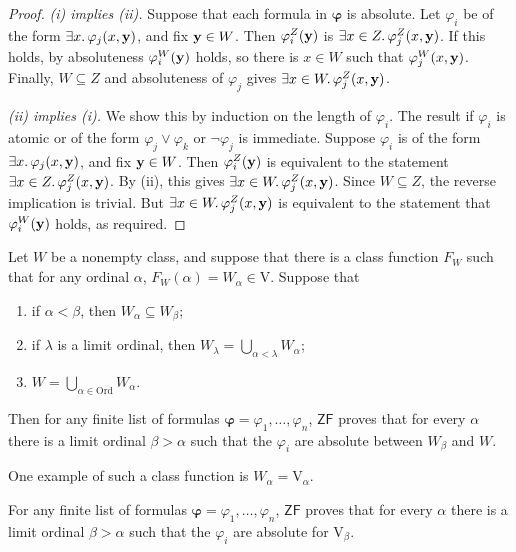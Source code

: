 \begin{proof}
    \emph{(i) implies (ii).}
    Suppose that each formula in \( \bm\varphi \) is absolute.
    Let \( \varphi_i \) be of the form \( \exists x.\, \varphi_j(x, \vb y) \), and fix \( \vb y \in W \).
    Then \( \varphi_i^Z(\vb y) \) is \( \exists x \in Z.\, \varphi_j^Z(x, \vb y) \).
    If this holds, by absoluteness \( \varphi_i^W(\vb y) \) holds, so there is \( x \in W \) such that \( \varphi_j^W(x, \vb y) \).
    Finally, \( W \subseteq Z \) and absoluteness of \( \varphi_j \) gives \( \exists x \in W.\, \varphi_j^Z(x, \vb y) \).

    \emph{(ii) implies (i).}
    We show this by induction on the length of \( \varphi_i \).
    The result if \( \varphi_i \) is atomic or of the form \( \varphi_j \vee \varphi_k \) or \( \neg\varphi_j \) is immediate.
    Suppose \( \varphi_i \) is of the form \( \exists x.\, \varphi_j(x, \vb y) \), and fix \( \vb y \in W \).
    Then \( \varphi_i^Z(\vb y) \) is equivalent to the statement \( \exists x \in Z.\, \varphi_j^Z(x, \vb y) \).
    By (ii), this gives \( \exists x \in W.\, \varphi_j^Z(x, \vb y) \).
    Since \( W \subseteq Z \), the reverse implication is trivial.
    But \( \exists x \in W.\, \varphi_j^Z(x, \vb y) \) is equivalent to the statement that \( \varphi_i^W(\vb y) \) holds, as required.
\end{proof}
\begin{theorem}
    Let \( W \) be a nonempty class, and suppose that there is a class function \( F_W \) such that for any ordinal \( \alpha \), \( F_W(\alpha) = W_\alpha \in \mathrm{V} \).
    Suppose that
    \begin{enumerate}
        \item if \( \alpha < \beta \), then \( W_\alpha \subseteq W_\beta \);
        \item if \( \lambda \) is a limit ordinal, then \( W_\lambda = \bigcup_{\alpha < \lambda} W_\alpha \);
        \item \( W = \bigcup_{\alpha \in \mathrm{Ord}} W_\alpha \).
    \end{enumerate}
    Then for any finite list of formulas \( \bm\varphi = \varphi_1, \dots, \varphi_n \), \( \mathsf{ZF} \) proves that for every \( \alpha \) there is a limit ordinal \( \beta > \alpha \) such that the \( \varphi_i \) are absolute between \( W_\beta \) and \( W \).
\end{theorem}
One example of such a class function is \( W_\alpha = \mathrm{V}_\alpha \).
\begin{corollary}
    For any finite list of formulas \( \bm\varphi = \varphi_1, \dots, \varphi_n \), \( \mathsf{ZF} \) proves that for every \( \alpha \) there is a limit ordinal \( \beta > \alpha \) such that the \( \varphi_i \) are absolute for \( \mathrm{V}_\beta \).
\end{corollary}

